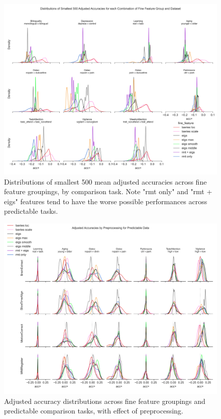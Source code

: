 \documentclass{article}  %
\begin{document}
\begin{figure}[H]
\begin{center}
\includegraphics[width=\textwidth,height=0.9\textheight,keepaspectratio]{fine_feature_smallest_accs_by_subgroup.png}
\end{center}
\caption
{ \label{fig:fine-smallest-acc} Distributions of smallest 500 mean adjusted
accuracies across fine feature groupings, by comparison task. Note "rmt only"
and "rmt + eigs" features tend to have the worse possible performances across
predictable tasks.}
\end{figure}


\begin{figure}[H]
\begin{center}
\includegraphics[width=\textwidth,height=0.9\textheight,keepaspectratio]{fine_feature_accs_by_preproc_predictive_subgroup.png}
\end{center}
\caption
{ \label{fig:fine-preproc-acc} Adjusted accuracy distributions across fine
feature groupings and predictable comparison tasks, with effect of
preprocessing.}
\end{figure}
\end{document}

